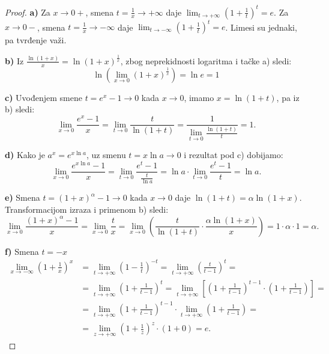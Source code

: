 \documentclass[a4paper,12pt]{article}
\theoremstyle{plain}
\theoremstyle{definition}
\theoremstyle{remark}
\begin{document}
\begin{proof}
    \textbf{a)} Za $x \to 0+$, smena $t = \frac{1}{x} \to +\infty$ daje $\displaystyle \lim_{t \to +\infty} \left(1 + \frac{1}{t}\right)^t = e$. Za $x \to 0-$, smena $t = \frac{1}{x} \to -\infty$ daje $\displaystyle \lim_{t \to -\infty} \left(1 + \frac{1}{t}\right)^t = e$. Limesi su jednaki, pa tvrđenje važi.

    \textbf{b)} Iz $\displaystyle \frac{\ln(1+x)}{x} = \ln(1+x)^{\frac{1}{x}}$, zbog neprekidnosti logaritma i tačke a) sledi: \[\displaystyle \ln \left( \lim_{x \to 0} (1+x)^{\frac{1}{x}} \right) = \ln e = 1\]

    \textbf{c)} Uvođenjem smene $t = e^x - 1 \to 0$ kada $x \to 0$, imamo $x = \ln(1+t)$, pa iz b) sledi:
    \[ \lim_{x \to 0} \frac{e^x - 1}{x} = \lim_{t \to 0} \frac{t}{\ln(1+t)} = \frac{1}{\displaystyle \lim_{t \to 0} \frac{\ln(1+t)}{t}} = 1. \]

    \textbf{d)} Kako je $a^x = e^{x \ln a}$, uz smenu $t = x \ln a \to 0$ i rezultat pod c) dobijamo:
    \[ \lim_{x \to 0} \frac{e^{x \ln a} - 1}{x} = \lim_{t \to 0} \frac{e^t - 1}{\frac{t}{\ln a}} = \ln a \cdot \lim_{t \to 0} \frac{e^t - 1}{t} = \ln a. \]

    \textbf{e)} Smena $t = (1+x)^\alpha - 1 \to 0$ kada $x \to 0$ daje $\ln(1+t) = \alpha \ln(1+x)$. Transformacijom izraza i primenom b) sledi:
    \[ \lim_{x \to 0} \frac{(1+x)^\alpha - 1}{x} = \lim_{x \to 0} \frac{t}{x} = \lim_{x \to 0} \left( \frac{t}{\ln(1+t)} \cdot \frac{\alpha \ln(1+x)}{x} \right) = 1 \cdot \alpha \cdot 1 = \alpha. \]

    \textbf{f)} Smena $t = -x$
    \[\begin{aligned}
\lim_{x \to -\infty} \left(1 + \frac{1}{x}\right)^x 
&= \lim_{t \to +\infty} \left(1 - \frac{1}{t}\right)^{-t} = \lim_{t \to +\infty} \left(\frac{t}{t-1}\right)^t = \\
&= \lim_{t \to +\infty} \left(1 + \frac{1}{t-1}\right)^t = \lim_{t \to +\infty} \left[\left(1 + \frac{1}{t-1}\right)^{t-1} \cdot \left(1 + \frac{1}{t-1}\right)\right] = \\
&= \lim_{t \to +\infty} \left(1 + \frac{1}{t-1}\right)^{t-1} \cdot \lim_{t \to +\infty} \left(1 + \frac{1}{t-1}\right) = \\
&= \lim_{z \to +\infty} \left(1 + \frac{1}{z}\right)^z \cdot (1 + 0) = e.
\end{aligned}\]
\end{proof}
\end{document}
